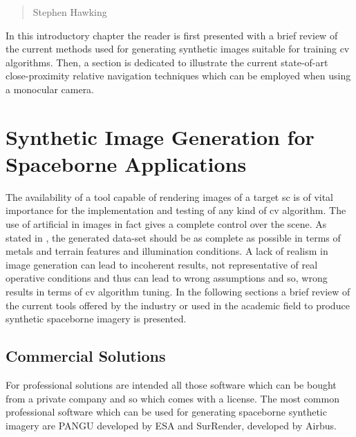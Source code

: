 \begin{quotation}
  {\footnotesize
    \begin{flushright}
      Stephen Hawking
    \end{flushright}
  }
\end{quotation}
\vspace{0.5cm}

In this introductory chapter the reader is first presented with a brief review of the current methods used for generating synthetic images suitable for training \acrshort{cv} algorithms. Then, a section is dedicated to illustrate the current state-of-art close-proximity relative navigation techniques which can be employed when using a monocular camera.

\section{Synthetic Image Generation for Spaceborne Applications}
The availability of a tool capable of rendering images of a target \acrshort{sc} is of vital importance for the implementation and testing of any kind of \acrshort{cv} algorithm. The use of artificial in images in fact gives a complete control over the scene. As stated in \cite{paolocorti}, the generated data-set should be as complete as possible in terms of metals and terrain features and illumination conditions. A lack of realism in image generation can lead to incoherent results, not representative of real operative conditions and thus can lead to wrong assumptions and so, wrong results in terms of \acrshort{cv} algorithm tuning.
In the following sections a brief review of the current tools offered by the industry or used in the academic field to produce synthetic spaceborne imagery is presented.

\subsection{Commercial Solutions}
For professional solutions are intended all those software which can be bought from a private company and so which comes with a license. The most common professional software which can be used for generating spaceborne synthetic imagery are PANGU developed by ESA and SurRender, developed by Airbus.

